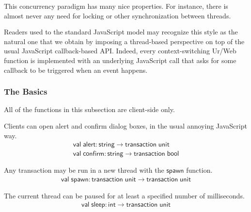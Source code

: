 \documentclass{article}
\newcommand{\mt}[1]{\mathsf{#1}}
\begin{document}
This concurrency paradigm has many nice properties.  For instance, there is almost never any need for locking or other synchronization between threads.

Readers used to the standard JavaScript model may recognize this style as the natural one that we obtain by imposing a thread-based perspective on top of the usual JavaScript callback-based API.  Indeed, every context-switching Ur/Web function is implemented with an underlying JavaScript call that asks for some callback to be triggered when an event happens.

\subsubsection{The Basics}

All of the functions in this subsection are client-side only.

Clients can open alert and confirm dialog boxes, in the usual annoying JavaScript way.
$$\begin{array}{l}
  \mt{val} \; \mt{alert} : \mt{string} \to \mt{transaction} \; \mt{unit} \\
  \mt{val} \; \mt{confirm} : \mt{string} \to \mt{transaction} \; \mt{bool}
\end{array}$$

Any transaction may be run in a new thread with the $\mt{spawn}$ function.
$$\begin{array}{l}
  \mt{val} \; \mt{spawn} : \mt{transaction} \; \mt{unit} \to \mt{transaction} \; \mt{unit}
\end{array}$$

The current thread can be paused for at least a specified number of milliseconds.
$$\begin{array}{l}
  \mt{val} \; \mt{sleep} : \mt{int} \to \mt{transaction} \; \mt{unit}
\end{array}$$
\end{document}
